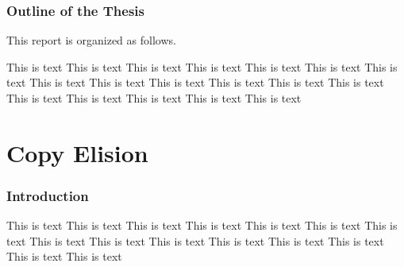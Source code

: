 \documentclass[a4paper]{uestcreport}
\begin{document}
\section{Outline of the Thesis}
This report is organized as follows.

This is text This is text This is text This is text This is text This is text This is text This is text This is text This is text This is text This is text This is text This is text This is text This is text This is text This is text 

\newpage

\thispagestyle{fancy}
\fancyhead[L]{}
\fancyhead[R]{}
\setcounter{section}{0}
\part{Copy Elision}
\section{Introduction}
This is text This is text This is text This is text This is text This is text This is text This is text This is text 
This is text This is text This is text This is text This is text This is text 
\end{document}
